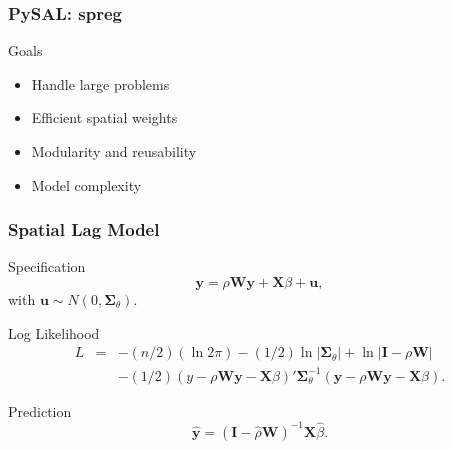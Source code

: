 \documentclass{beamer}
\begin{document}
\begin{frame}\frametitle{PySAL: spreg}
  \begin{block}{Goals}
    \begin{itemize}
      \item Handle large problems
      \item Efficient spatial weights
      \item Modularity and reusability 
       \item Model complexity
    \end{itemize}
  \end{block}
\end{frame}
\begin{frame}\frametitle{Spatial Lag Model}
  \begin{block}{Specification}
\begin{equation}
\mathbf{y} = \rho \mathbf{W} \mathbf{y} + \mathbf{X} \beta + \mathbf{u},
\end{equation}
with $\mathbf{u} \sim N(0, \mathbf{\Sigma}_{\theta})$.
  \end{block}
  \begin{block}{Log Likelihood}
\begin{eqnarray}\label{eq:spatiallagloglik}
L &= &-(n/2)(\ln 2\pi) - (1/2) \ln | \mathbf{\Sigma}_{\theta} | + \ln | \mathbf{I} - \rho \mathbf{W} | \nonumber \\
     & &- (1/2)(y - \rho \mathbf{W y} - \mathbf{X} \beta)' \mathbf{\Sigma}_{\theta}^{-1}(\mathbf{y} - \rho \mathbf{W y} - \mathbf{X} \beta).
\end{eqnarray}
   \end{block}
   \begin{block}{Prediction}
\begin{equation}\label{eq:lagpredicted}
\hat{\mathbf{y}} = ( \mathbf{I} - \hat{\rho} \mathbf{W} )^{-1} \mathbf{X} \hat{\beta}.
\end{equation}
    \end{block}
\end{frame}
\end{document}
